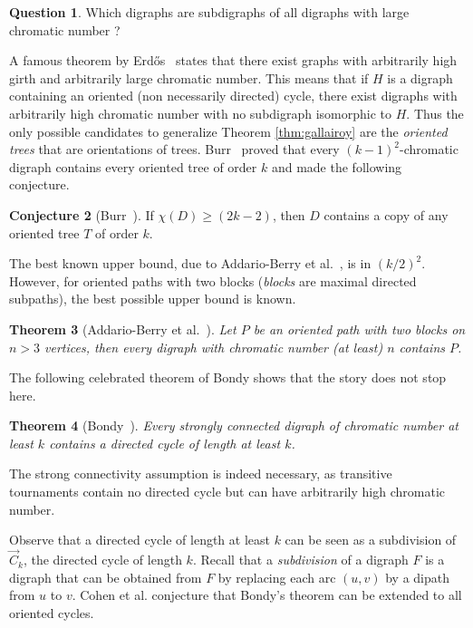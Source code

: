 \documentclass[utf8,10pt]{article}
\theoremstyle{plain}
\newtheorem{theorem}{Theorem}
\theoremstyle{definition}
\newtheorem{conjecture}[theorem]{Conjecture}
\newtheorem{question}[theorem]{Question}
\theoremstyle{remark}
\begin{document}
\begin{question}
Which digraphs are subdigraphs of all digraphs with large chromatic number ?
\end{question}



A famous theorem by Erd\H{o}s~\cite{Erd59} states that there exist graphs with arbitrarily high girth and arbitrarily large
chromatic number. This means that if $H$ is a digraph containing an oriented (non necessarily directed) cycle, there exist digraphs with arbitrarily high 
chromatic number with no subdigraph isomorphic to $H$. Thus the only possible candidates to generalize Theorem \ref{thm:gallairoy} are the {\it oriented trees} that are orientations of trees.
Burr~\cite{Burr80} proved that every $(k-1)^2$-chromatic digraph contains every oriented tree of order $k$ and made the following conjecture.

\begin{conjecture}[Burr~\cite{Burr80}]\label{cnj:tn}
	 If $\chi(D) \geq (2k-2)$, then $D$ contains a copy of any oriented tree $T$ of order $k$.
\end{conjecture}
The best known upper bound, due to Addario-Berry et al.~\cite{AHS+13}, is in $(k/2)^2$.
However, for oriented paths with two blocks ({\it blocks} are maximal directed subpaths), the best possible upper bound is known.

\begin{theorem}[Addario-Berry et al.~\cite{AHT07}]\label{thm:2blocks}
Let $P$ be an oriented path with two blocks on $n > 3$ vertices, then every digraph with chromatic number (at least) $n$ contains $P$. 
\end{theorem}



The following celebrated theorem of Bondy shows that  the story does not stop here.

\begin{theorem}[Bondy~\cite{Bon76}]\label{thm:bondy}
Every strongly connected digraph of chromatic number at least $k$ contains a directed cycle of length at least $k$.
\end{theorem} 

The strong connectivity assumption is indeed necessary, as transitive tournaments contain no directed cycle but can have arbitrarily  high chromatic number. 

Observe that a directed cycle of length at least $k$ can be seen as a subdivision of $\vec{C}_k$, the directed cycle of length $k$.
Recall that a {\it subdivision} of a digraph $F$ is a digraph that can be obtained from $F$ by replacing each arc $(u,v)$ by a dipath from $u$ to $v$. Cohen et al.  \cite{CHLN16} conjecture that Bondy's theorem can be extended to all oriented cycles.
\end{document}
